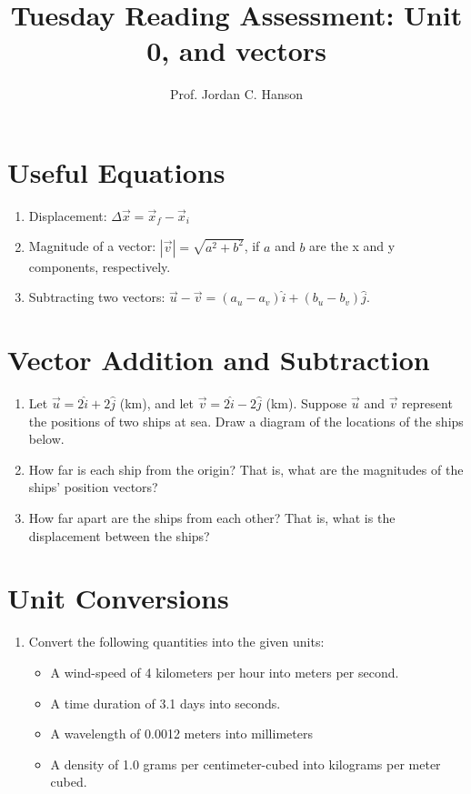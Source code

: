 \documentclass{article}
\begin{document}
\title{Tuesday Reading Assessment: Unit 0, and vectors}
\author{Prof. Jordan C. Hanson}

\maketitle

\section{Useful Equations}

\begin{enumerate}
\item Displacement: $\Delta \vec{x} = \vec{x}_f - \vec{x}_i$
\item Magnitude of a vector: $|\vec{v}| = \sqrt{a^2 + b^2}$, if $a$ and $b$ are the x and y components, respectively.
\item Subtracting two vectors: $\vec{u} - \vec{v} = (a_u - a_v)\hat{i} + (b_u - b_v) \hat{j}$.
\end{enumerate}

\section{Vector Addition and Subtraction}

\begin{enumerate}
\item Let $\vec{u} = 2\hat{i} + 2\hat{j}$ (km), and let $\vec{v} = 2\hat{i} - 2\hat{j}$ (km).  Suppose $\vec{u}$ and $\vec{v}$ represent the positions of two ships at sea.  Draw a diagram of the locations of the ships below. \\ \vspace{2cm}
\item How far is each ship from the origin?  That is, what are the magnitudes of the ships' position vectors? \\ \vspace{1cm}
\item How far apart are the ships from each other? That is, what is the displacement between the ships? \\ \vspace{1cm}
\end{enumerate}

\section{Unit Conversions}

\begin{enumerate}
\item Convert the following quantities into the given units:
\begin{itemize}
\item A wind-speed of 4 kilometers per hour into meters per second.
\item A time duration of 3.1 days into seconds.
\item A wavelength of 0.0012 meters into millimeters
\item A density of 1.0 grams per centimeter-cubed into kilograms per meter cubed.
\end{itemize} 
\end{enumerate}
\end{document}
